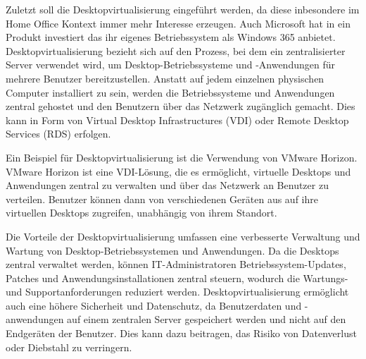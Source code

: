 Zuletzt soll die Desktopvirtualisierung eingeführt werden, da diese inbesondere im Home Office Kontext immer mehr Interesse erzeugen. Auch Microsoft hat in ein Produkt investiert das ihr eigenes Betriebssystem als Windows 365 anbietet. Desktopvirtualisierung bezieht sich auf den Prozess, bei dem ein zentralisierter Server verwendet wird, um Desktop-Betriebssysteme und -Anwendungen für mehrere Benutzer bereitzustellen. Anstatt auf jedem einzelnen physischen Computer installiert zu sein, werden die Betriebssysteme und Anwendungen zentral gehostet und den Benutzern über das Netzwerk zugänglich gemacht. Dies kann in Form von Virtual Desktop Infrastructures (VDI) oder Remote Desktop Services (RDS) erfolgen.

Ein Beispiel für Desktopvirtualisierung ist die Verwendung von VMware Horizon. VMware Horizon ist eine VDI-Lösung, die es ermöglicht, virtuelle Desktops und Anwendungen zentral zu verwalten und über das Netzwerk an Benutzer zu verteilen. Benutzer können dann von verschiedenen Geräten aus auf ihre virtuellen Desktops zugreifen, unabhängig von ihrem Standort.

Die Vorteile der Desktopvirtualisierung umfassen eine verbesserte Verwaltung und Wartung von Desktop-Betriebssystemen und Anwendungen. Da die Desktops zentral verwaltet werden, können IT-Administratoren Betriebssystem-Updates, Patches und Anwendungsinstallationen zentral steuern, wodurch die Wartungs- und Supportanforderungen reduziert werden. Desktopvirtualisierung ermöglicht auch eine höhere Sicherheit und Datenschutz, da Benutzerdaten und -anwendungen auf einem zentralen Server gespeichert werden und nicht auf den Endgeräten der Benutzer. Dies kann dazu beitragen, das Risiko von Datenverlust oder Diebstahl zu verringern.

